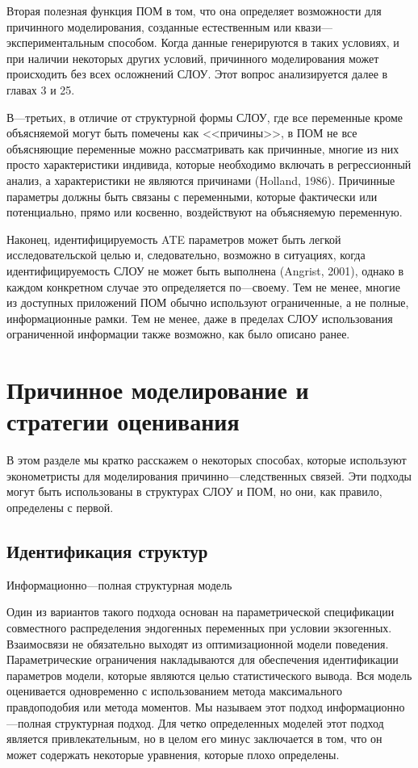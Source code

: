 	
	Вторая полезная функция ПОМ в том, что она определяет возможности для причинного моделирования, созданные естественным или квази---экспериментальным способом. Когда данные генерируются в таких условиях, и при наличии некоторых других условий, причинного моделирования может происходить без всех осложнений СЛОУ. Этот вопрос анализируется далее в главах 3 и 25.


	В---третьих, в отличие от структурной формы СЛОУ, где все переменные кроме объясняемой могут быть помечены как <<причины>>, в ПОМ не все объясняющие переменные можно рассматривать как причинные, многие из них просто характеристики индивида, которые необходимо включать в регрессионный анализ, а характеристики не являются причинами (Holland, 1986). Причинные параметры должны быть связаны с переменными, которые фактически или потенциально, прямо или косвенно, воздействуют на объясняемую переменную.
	
	
	Наконец, идентифицируемость ATE параметров может быть легкой исследовательской целью  и, следовательно, возможно в ситуациях, когда идентифицируемость СЛОУ не может быть выполнена (Angrist, 2001), однако в каждом конкретном случае это определяется по---своему. Тем не менее, многие из доступных приложений ПОМ обычно используют ограниченные, а не полные, информационные рамки. Тем не менее, даже в пределах СЛОУ использования ограниченной информации также возможно, как было описано ранее.



\section{Причинное моделирование и стратегии оценивания}


В этом разделе мы кратко расскажем о некоторых способах, которые используют эконометристы для моделирования причинно---следственных связей. Эти подходы могут быть использованы в структурах СЛОУ и ПОМ, но они, как правило, определены с первой.

\subsection{Идентификация структур}
\begin{center}
Информационно---полная структурная модель
\end{center}


Один из вариантов такого подхода основан на параметрической спецификации совместного распределения эндогенных переменных при условии экзогенных. Взаимосвязи не обязательно выходят из оптимизационной модели поведения. Параметрические ограничения накладываются для обеспечения идентификации параметров модели, которые являются целью статистического вывода. Вся модель оценивается одновременно с использованием метода максимального правдоподобия или метода моментов. Мы называем этот подход информационно---полная структурная подход. Для четко определенных моделей этот подход является привлекательным, но в целом его минус заключается в том, что он может содержать некоторые уравнения, которые плохо определены. 


